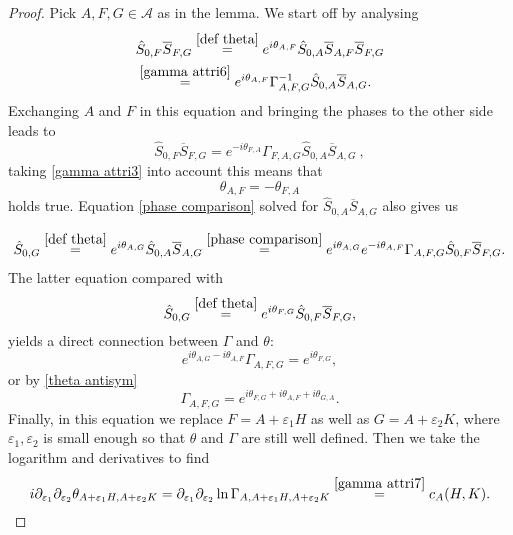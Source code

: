 \documentclass[a4paper,11pt]{article}
\begin{document}
\begin{proof}
Pick \(A,F,G\in\mathcal{A}\) as in the lemma. We start off by analysing
\begin{align}
&\hat{S}_{0,F}\overline{S}_{F,G}\overset{\eqref{def theta}}{=}e^{i\theta_{A,F}}\hat{S}_{0,A}\overline{S}_{A,F}\overline{S}_{F,G}\\\label{phase comparison}
&\overset{\eqref{gamma attri6}}{=}e^{i\theta_{A,F}} \Gamma_{A,F,G}^{-1} \hat{S}_{0,A} \overline{S}_{A,G}.
\end{align}
Exchanging  \(A\) and \(F\) in this equation and bringing the phases to the other side leads to
\begin{equation}
\hat{S}_{0,F} \overline{S}_{F,G}=e^{-i\theta_{F,A}} \Gamma_{F,A,G} \hat{S}_{0,A}\overline{S}_{A,G}~,
\end{equation}
taking \eqref{gamma attri3} into account this means that 
\begin{equation}
\theta_{A,F}=-\theta_{F,A}
\end{equation}
holds true. Equation \eqref{phase comparison} solved for \(\hat{S}_{0,A}\overline{S}_{A,G}\) also gives us

\begin{align}
\hat{S}_{0,G}\overset{\eqref{def theta}}{=}e^{i\theta_{A,G}}\hat{S}_{0,A}\overline{S}_{A,G}\overset{\eqref{phase comparison}}{=}e^{i\theta_{A,G}}e^{-i\theta_{A,F}}\Gamma_{A,F,G}\hat{S}_{0,F}\overline{S}_{F,G}.
\end{align}
The latter equation compared with 
\begin{equation}
\hat{S}_{0,G}\overset{\eqref{def theta}}{=}e^{i\theta_{F,G}}\hat{S}_{0,F}\overline{S}_{F,G},
\end{equation}
yields  a direct connection between \(\Gamma\) and \(\theta\):
\begin{equation}
e^{i\theta_{A,G}-i\theta_{A,F}}\Gamma_{A,F,G}=e^{i\theta_{F,G}},
\end{equation}
or by \eqref{theta antisym}
\begin{equation}
\Gamma_{A,F,G}=e^{i \theta_{F,G}+i\theta_{A,F}+i\theta_{G,A}}.
\end{equation}
Finally, in this equation we replace \(F=A+\varepsilon_1 H\) as well as  \(G=A+\varepsilon_2 K\), where \(\varepsilon_1,\varepsilon_2\) is small enough so that 
\(\theta\) and \(\Gamma\) are still well defined. Then we take the logarithm and derivatives to find
\begin{equation}
i \partial_{\varepsilon_1}\partial_{\varepsilon_2} \theta_{A+\varepsilon_1 H,A+\varepsilon_2 K}=\partial_{\varepsilon_1}\partial_{\varepsilon_2}\ln\Gamma_{A,A+\varepsilon_1 H,A+\varepsilon_2 K}\overset{\eqref{gamma attri7}}{=}c_A(H,K). 
\end{equation}

\end{proof}
\end{document}
